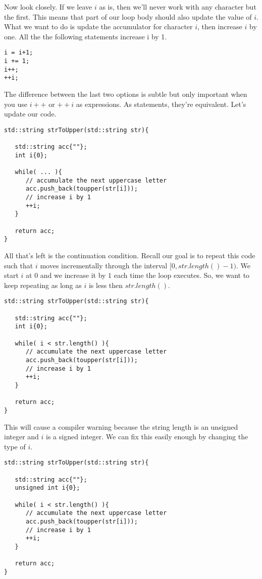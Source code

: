\documentclass[]{tufte-handout}
\begin{document}
Now look closely. If we leave $i$ as is, then we'll never work with any character but the first. This means that part of our loop body should also update the value of $i$.  What we want to do is update the accumulator for character $i$, then increase $i$ by one.  All the the following statements increase i by 1.
\begin{verbatim}
i = i+1;
i += 1;
i++;
++i;
\end{verbatim}
The difference between the last two options is subtle but only important when you use $i++$ or $++i$ as expressions.  As statements, they're equivalent. Let's update our code.

\begin{verbatim}
std::string strToUpper(std::string str){
   
   std::string acc{""};   
   int i{0}; 	
   
   while( ... ){
      // accumulate the next uppercase letter
      acc.push_back(toupper(str[i]));
	  // increase i by 1
      ++i;  
   }
   
   return acc;
}
\end{verbatim}

All that's left is the continuation condition. Recall our goal is to repeat this code such that $i$ moves incrementally through the interval $[0,str.length()-1)$.  We start $i$ at 0 and we increase it by $1$ each time the loop executes. So, we want to keep repeating as long as $i$ is less then $str.length()$. 
\begin{verbatim}
std::string strToUpper(std::string str){
   
   std::string acc{""};   
   int i{0}; 	
   
   while( i < str.length() ){
      // accumulate the next uppercase letter
      acc.push_back(toupper(str[i]));
	  // increase i by 1
      ++i;  
   }
   
   return acc;
}
\end{verbatim}

This will cause a compiler warning because the string length is an unsigned integer and $i$ is a signed integer.  We can fix this easily enough by changing the type of $i$.
\begin{verbatim}
std::string strToUpper(std::string str){
   
   std::string acc{""};   
   unsigned int i{0}; 	
   
   while( i < str.length() ){
      // accumulate the next uppercase letter
      acc.push_back(toupper(str[i]));
	  // increase i by 1
      ++i;  
   }
   
   return acc;
}
\end{verbatim}
\end{document}
